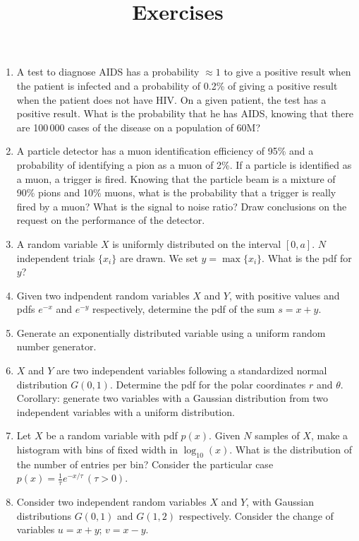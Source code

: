 \documentclass[a4paper,12pt]{article}
\title{Exercises}
\author{}
\date{}
\begin{document}
 \maketitle
 
 \begin{enumerate}
  \item A test to diagnose AIDS has a probability $\approx 1$ to give a positive result when the patient is infected and a probability of 0.2\% of giving a positive result when the patient
  does not have HIV. On a given patient, the test has a positive result. What is the probability that he has AIDS, knowing that there are 100\,000 cases of the disease on a population
  of 60M?
  \item A particle detector has a muon identification efficiency of 95\% and a probability of identifying a pion as a muon of 2\%. If a particle is identified as a muon, a trigger is
  fired. Knowing that the particle beam is a mixture of 90\% pions and 10\% muons, what is the probability that a trigger is really fired by a muon? What is the signal to noise ratio?
  Draw conclusions on the request on the performance of the detector.
  \item A random variable $X$ is uniformly distributed on the interval $[0,a]$. $N$ independent trials $\{x_i\}$ are drawn. We set $y = \max\{x_i\}$. What is the pdf for $y$?
  \item Given two indpendent random variables $X$ and $Y$, with positive values and pdfs $e^{-x}$ and $e^{-y}$ respectively, determine the pdf of the sum $s = x+y$.
  \item Generate an exponentially distributed variable using a uniform random number generator.
  \item $X$ and $Y$ are two independent variables following a standardized normal distribution $G(0,1)$. Determine the pdf for the polar coordinates $r$ and $\theta$.\\
  Corollary: generate two variables with a Gaussian distribution from two independent variables with a uniform distribution.
  \item Let $X$ be a random variable with pdf $p(x)$. Given $N$ samples of $X$, make a histogram with bins of fixed width in $\log_{10}(x)$. What is the distribution of the number of
  entries per bin? Consider the particular case $p(x) = \frac{1}{\tau}e^{-x/\tau}\,(\tau>0)$.
  \item Consider two independent random variables $X$ and $Y$, with Gaussian distributions $G(0,1)$ and $G(1,2)$ respectively. Consider the change of variables $u=x+y$; $v=x-y$.

\end{enumerate}
\end{document}
